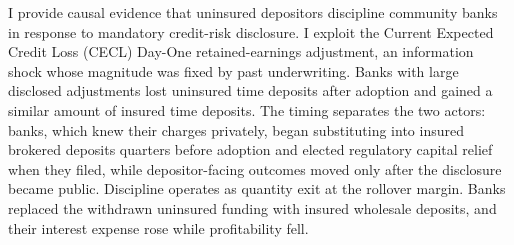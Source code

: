I provide causal evidence that uninsured depositors discipline community
banks in response to mandatory credit-risk disclosure.  I exploit the
Current Expected Credit Loss (CECL) Day-One retained-earnings
adjustment, an information shock whose magnitude was fixed by past
underwriting.  Banks with large disclosed adjustments lost uninsured
time deposits after adoption and gained a similar amount of insured
time deposits.  The timing separates the two actors: banks,
which knew their charges privately, began substituting into insured
brokered deposits quarters before adoption and elected regulatory
capital relief when they filed, while depositor-facing outcomes moved
only after the disclosure became public.  Discipline operates as quantity
exit at the rollover margin.  Banks replaced the withdrawn uninsured
funding with insured wholesale deposits, and their interest expense
rose while profitability fell.
